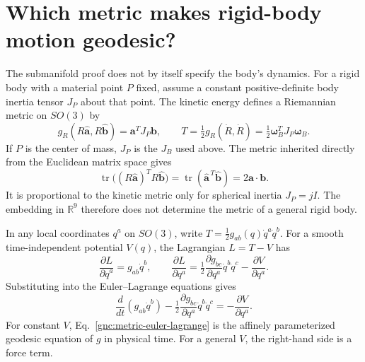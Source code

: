 

\section{Which metric makes rigid-body motion geodesic?}\label{gnc:sec:geodesic}
The submanifold proof does not by itself specify the body's dynamics.
For a rigid body with a material point $P$ fixed, assume a constant
positive-definite body inertia tensor $J_P$ about that point. The kinetic
energy defines a Riemannian metric on $SO(3)$ by
\begin{equation}\label{gnc:kinetic-metric}
 g_R(R\widehat{\mathbf a},R\widehat{\mathbf b})
 =\mathbf a^TJ_P\mathbf b,\qquad
 T=\tfrac12g_R(\dot R,\dot R)
  =\tfrac12\boldsymbol\omega_B^TJ_P\boldsymbol\omega_B.
\end{equation}
If $P$ is the center of mass, $J_P$ is the $J_B$ used above.
The metric inherited directly from the Euclidean matrix space gives
\[
 \operatorname{tr}\bigl((R\widehat{\mathbf a})^T
                         R\widehat{\mathbf b}\bigr)
 =\operatorname{tr}(\widehat{\mathbf a}^{\,T}\widehat{\mathbf b})
 =2\mathbf a\cdot\mathbf b.
\]
It is proportional to the kinetic metric only for spherical inertia
$J_P=jI$. The embedding in $\mathbb R^9$ therefore does not determine
the metric of a general rigid body.

In any local coordinates $q^a$ on $SO(3)$, write
$T=\tfrac12g_{ab}(q)\dot q^a\dot q^b$. For a smooth time-independent
potential $V(q)$, the Lagrangian $L=T-V$ has
\[
 \frac{\partial L}{\partial\dot q^a}=g_{ab}\dot q^b,\qquad
 \frac{\partial L}{\partial q^a}
 =\tfrac12\frac{\partial g_{bc}}{\partial q^a}\dot q^b\dot q^c
  -\frac{\partial V}{\partial q^a}.
\]
Substituting into the Euler--Lagrange equations gives
\begin{equation}\label{gnc:metric-euler-lagrange}
 \frac{d}{dt}(g_{ab}\dot q^b)
 -\tfrac12\frac{\partial g_{bc}}{\partial q^a}\dot q^b\dot q^c
 =-\frac{\partial V}{\partial q^a}.
\end{equation}
For constant $V$, Eq.~\eqref{gnc:metric-euler-lagrange} is the
affinely parameterized geodesic equation of $g$ in physical time.
For a general $V$, the right-hand side is a force term.

